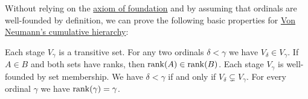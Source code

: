 \begin{proposition}\label{thm:cumulative_hierarchy_properties}
  Without relying on the \hyperref[def:zfc/foundation]{axiom of foundation} and by assuming that ordinals are well-founded by definition, we can prove the following basic properties for \hyperref[def:cumulative_hierarchy]{Von Neumann's cumulative hierarchy}:
  \begin{thmenum}
     Each stage \( V_\gamma \) is a transitive set.
     For any two ordinals \( \delta < \gamma \) we have \( V_\delta \in V_\gamma \).
     If \( A \in B \) and both sets have ranks, then \( \operatorname{rank}(A) \in \operatorname{rank}(B) \).
     Each stage \( V_\gamma \) is well-founded by set membership.
     We have \( \delta < \gamma \) if and only if \( V_\delta \subsetneq V_\gamma \).
     For every ordinal \( \gamma \) we have \( \operatorname{rank}(\gamma) = \gamma \).
  \end{thmenum}
\end{proposition}
